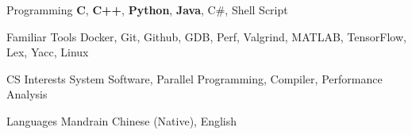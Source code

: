 

\begin{cvskills}

  \cvskill
    {Programming} %
    {\textbf{C}, \textbf{C++}, \textbf{Python}, \textbf{Java}, C\#, Shell Script} %

  \cvskill
    {Familiar Tools} %
    {Docker, Git, Github, GDB, Perf, Valgrind, MATLAB, TensorFlow, Lex, Yacc, Linux} %

  \cvskill
    {CS Interests} %
    {System Software, Parallel Programming, Compiler, Performance Analysis} %

  \cvskill
    {Languages} %
    {Mandrain Chinese (Native), English} %

\end{cvskills}
